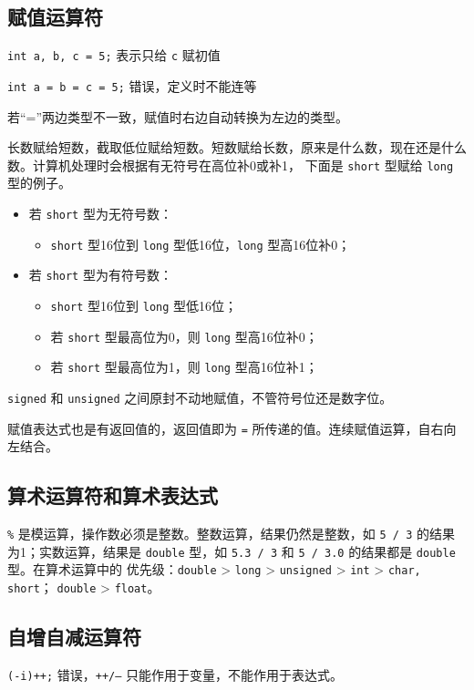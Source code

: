 \documentclass[UTF8]{ctexart}
\begin{document}
\subsection{赋值运算符}
\texttt{int a, b, c = 5;} 表示只给 \texttt{c} 赋初值

\texttt{int a = b = c = 5;} 错误，定义时不能连等

若“=”两边类型不一致，赋值时右边自动转换为左边的类型。

长数赋给短数，截取低位赋给短数。短数赋给长数，原来是什么数，现在还是什么数。计算机处理时会根据有无符号在高位补0或补1，
下面是 \texttt{short} 型赋给 \texttt{long} 型的例子。
\begin{itemize}
    \item 若 \texttt{short} 型为无符号数：
    \begin{itemize}
        \item \texttt{short} 型16位到 \texttt{long} 型低16位，\texttt{long} 型高16位补0；
    \end{itemize}
    \item 若 \texttt{short} 型为有符号数：
    \begin{itemize}
        \item \texttt{short} 型16位到 \texttt{long} 型低16位；
        \item 若 \texttt{short} 型最高位为0，则 \texttt{long} 型高16位补0；
        \item 若 \texttt{short} 型最高位为1，则 \texttt{long} 型高16位补1；
    \end{itemize}
\end{itemize}

\texttt{signed} 和 \texttt{unsigned} 之间原封不动地赋值，不管符号位还是数字位。

赋值表达式也是有返回值的，返回值即为 \texttt{=} 所传递的值。连续赋值运算，自右向左结合。

\subsection{算术运算符和算术表达式}
\texttt{\%} 是模运算，操作数必须是整数。整数运算，结果仍然是整数，如 \texttt{5 / 3} 的结果为1；实数运算，结果是
\texttt{double} 型，如 \texttt{5.3 / 3} 和 \texttt{5 / 3.0} 的结果都是 \texttt{double} 型。在算术运算中的
优先级：\texttt{double} > \texttt{long} > \texttt{unsigned} > \texttt{int} > \texttt{char, short}；
\texttt{double} > \texttt{float}。

\subsection{自增自减运算符}
\texttt{(-i)++;} 错误，\texttt{++/--} 只能作用于变量，不能作用于表达式。
\end{document}
